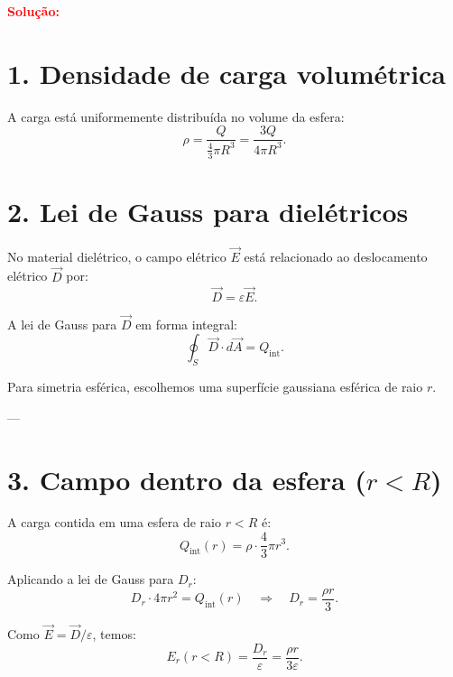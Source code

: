 \documentclass[a4paper,12pt]{article}
\begin{document}
\begin{flushleft}
\begin{center}
\end{center}

\textcolor{red}{\textbf{Solução:}}\\

\section*{1. Densidade de carga volumétrica}

A carga está uniformemente distribuída no volume da esfera:
\[
\rho = \frac{Q}{\frac{4}{3} \pi R^3} = \frac{3Q}{4\pi R^3}.
\]

\section*{2. Lei de Gauss para dielétricos}

No material dielétrico, o campo elétrico \( \vec{E} \) está relacionado ao deslocamento elétrico \( \vec{D} \) por:
\[
\vec{D} = \varepsilon \vec{E}.
\]

A lei de Gauss para \( \vec{D} \) em forma integral:
\[
\oint_{S} \vec{D} \cdot d\vec{A} = Q_{\text{int}}.
\]

Para simetria esférica, escolhemos uma superfície gaussiana esférica de raio \( r \).  

---

\section*{3. Campo dentro da esfera (\( r < R \))}

A carga contida em uma esfera de raio \( r < R \) é:
\[
Q_{\text{int}}(r) = \rho \cdot \frac{4}{3} \pi r^3.
\]

Aplicando a lei de Gauss para \( D_r \):
\[
D_r \cdot 4\pi r^2 = Q_{\text{int}}(r) \quad \Rightarrow \quad D_r = \frac{\rho r}{3}.
\]

Como \( \vec{E} = \vec{D}/\varepsilon \), temos:
\[
E_r(r<R) = \frac{D_r}{\varepsilon} = \frac{\rho r}{3\varepsilon}.
\]


\end{flushleft}
\end{document}
